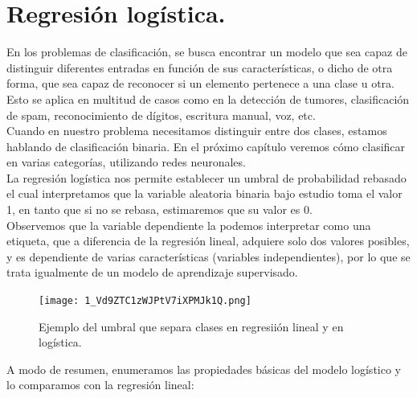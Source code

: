 \documentclass[a4paper,11pt]{article}
\begin{document}
\section{Regresión logística.}
En los problemas de clasificación, se busca encontrar un modelo que sea capaz de distinguir diferentes entradas en función de sus características, o dicho de otra forma, que sea capaz de reconocer si un elemento pertenece a una clase u otra. Esto se aplica
en multitud de casos como en la detección de tumores, clasificación de spam,
reconocimiento de dígitos, escritura manual, voz, etc.\\

\noindent
Cuando en nuestro problema necesitamos distinguir entre dos clases, estamos hablando de clasificación binaria. En el próximo
capítulo veremos cómo clasificar en varias categorías, utilizando redes neuronales.\\

\noindent
La regresión logística nos permite establecer un umbral de probabilidad rebasado el cual interpretamos que la variable aleatoria binaria bajo estudio toma el valor
1, en tanto que si no se rebasa, estimaremos que su valor es 0.\\

\noindent
Observemos que la variable dependiente la podemos interpretar como una etiqueta, que a diferencia de la regresión lineal, adquiere solo dos valores posibles,
y es dependiente de varias características (variables independientes), por lo que
se trata igualmente de un modelo de aprendizaje supervisado.

\begin{figure}[H]
\centering
\texttt{[image: 1\_Vd9ZTC1zWJPtV7iXPMJk1Q.png]}
\caption{Ejemplo del umbral que separa clases en regresiión lineal y en logística.}
\end{figure}
\noindent
A modo de resumen, enumeramos las propiedades básicas del modelo logístico y lo comparamos con la regresión lineal:
\end{document}
